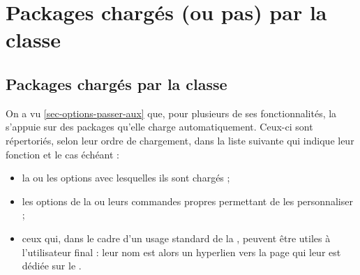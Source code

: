 \chapter{Packages chargés (ou pas) par la classe}\label{cha-packages-charges}

\section{Packages chargés par la classe}\label{sec-packages-charges-par}

On a vu \vref{sec-options-passer-aux} que, pour plusieurs de ses
fonctionnalités, la \yatCl s'appuie sur des packages
qu'elle charge automatiquement. Ceux-ci sont répertoriés, selon leur ordre de
chargement, dans la liste suivante qui indique leur fonction et le cas échéant :
\begin{itemize}
\item la ou les options avec lesquelles ils sont chargés ;
\item les options de la \yatCl{} ou leurs commandes propres permettant de les
  personnaliser ;
\item ceux qui, dans le cadre d'un usage standard de la \yatCl{}, peuvent être
  utiles à l'utilisateur final : leur nom est alors un hyperlien vers la page
  qui leur est dédiée sur le .
\end{itemize}

